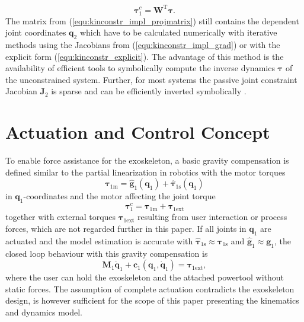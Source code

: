 \documentclass[letterpaper, 10 pt, conference]{ieeeconf}  %
\newcommand{\bm}[1]{\boldsymbol{#1}}
\begin{document}
%
\begin{equation}
\bm{\tau}^c_1 = \bm{W}^\mathrm{T} \bm{\tau}.
\label{equ:tau_projection}
\end{equation}
%
The matrix from (\ref{equ:kinconstr_impl_projmatrix}) still contains the dependent joint coordinates $\bm{q}_2$ which have to be calculated numerically with iterative methods using the Jacobians from (\ref{equ:kinconstr_impl_grad}) or with the explicit form (\ref{equ:kinconstr_explicit}).
The advantage of this method is the availability of efficient tools to symbolically compute the inverse dynamics $\bm{\tau}$ of the unconstrained system.
Further, for most systems the passive joint constraint Jacobian $\bm{J}_2$ is sparse and can be efficiently inverted symbolically \cite{ParkChoPlo1999}.

\section{Actuation and Control Concept}
\label{sec:actuation_control}

To enable force assistance for the exoskeleton, a basic gravity compensation is defined similar to the partial linearization in robotics with the motor torques
%
\begin{equation}
\bm{\tau}_{1\mathrm{m}} = \hat{\bm{g}}_1(\bm{q}_1) + \hat{\bm{\tau}}_{1\mathrm{s}}(\bm{q}_1)
\label{equ:GravKomp}
\end{equation}
%
in $\bm{q}_1$-coordinates and the motor affecting the joint torque
%
\begin{equation}
\bm{\tau}^c_1 = \bm{\tau}_{1\mathrm{m}} + \bm{\tau}_{1\mathrm{ext}}
\label{equ:JointTorque}
\end{equation}
%
together with external torques $\bm{\tau}_{1\mathrm{ext}}$ resulting from user interaction or process forces, which are not regarded further in this paper.
If all joints in $\bm{q}_1$ are actuated and the model estimation is accurate with $\hat{\bm{\tau}}_{1\mathrm{s}} \approx \bm{\tau}_{1\mathrm{s}}$ and $\hat{\bm{g}}_{1} \approx \bm{g}_{1}$, the closed loop behaviour with this gravity compensation is
%
\begin{equation}
\bm{M}_1\ddot{\bm{q}}_1+\bm{c}_1(\bm{q}_1,\dot{\bm{q}}_1) = \bm{\tau}_{1\mathrm{ext}},
\label{equ:closedloop}
\end{equation}
%
where the user can hold the exoskeleton and the attached powertool without static forces.
The assumption of complete actuation contradicts the exoskeleton design, is however sufficient for the scope of this paper presenting the kinematics and dynamics model.
\end{document}
